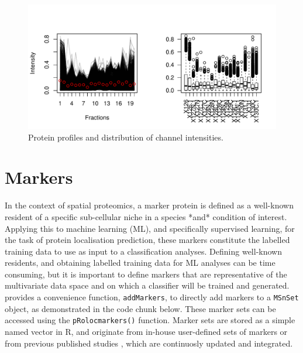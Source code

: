 \begin{figure}[!ht]
  \centering
\begin{knitrout}
\color{fgcolor}\begin{kframe}
\begin{alltt}
\hlstd{(} \hlstd{=} \hlstd{(}\hlstd{,} \hlstd{))}
 \hlkwb{<-} \hlopt{$}
  \hlstd{=} \hlstd{)}
\hlstd{(}\hlstd{(}  \hlstd{=} \hlstd{,}  \hlstd{=} \hlstd{)}
\hlstd{(}  \hlstd{=} \hlstd{)}
\end{alltt}
\end{kframe}
\includegraphics[width=\textwidth]{figure/qcbx-1} 

\end{knitrout}
  \caption{Protein profiles and distribution of channel intensities.}
  \label{fig:qcbx}
\end{figure}


\section*{Markers}

In the context of spatial proteomics, a marker protein is defined as a
well-known resident of a specific sub-cellular niche in a species
*and* condition of interest. Applying this to machine learning (ML),
and specifically supervised learning, for the task of protein
localisation prediction, these markers constitute the labelled training
data to use as input to a classification analyses. Defining well-known
residents, and obtaining labelled training data for ML analyses can be
time consuming, but it is important to define markers that are
representative of the multivariate data space and on which a
classifier will be trained and generated. 
provides a convenience function, \texttt{addMarkers}, to directly add markers
to a \texttt{MSnSet} object, as demonstrated in the code chunk below. These
marker sets can be accessed using the \texttt{pRolocmarkers()}
function. Marker sets are stored as a simple named vector in R, and
originate from in-house user-defined sets of markers or from previous
published studies \cite{Gatto:2014b}, which are continuosly updated and 
integrated. 

